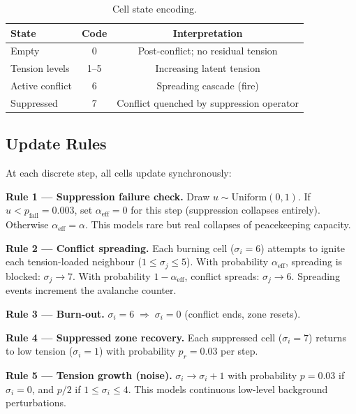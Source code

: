\documentclass[12pt,a4paper]{article}
\begin{document}
\begin{table}[h!]
\centering
\caption{Cell state encoding.}
\label{tab:states}
\begin{tabular}{lcc}
\toprule
\textbf{State}       & \textbf{Code} & \textbf{Interpretation}                        \\
\midrule
Empty                & 0             & Post-conflict; no residual tension             \\
Tension levels       & 1--5          & Increasing latent tension                      \\
Active conflict      & 6             & Spreading cascade (fire)                       \\
Suppressed           & 7             & Conflict quenched by suppression operator      \\
\bottomrule
\end{tabular}
\end{table}

\subsection{Update Rules}

At each discrete step, all cells update synchronously:

\textbf{Rule 1 --- Suppression failure check.}
Draw $u \sim \mathrm{Uniform}(0,1)$. If $u < p_{\text{fail}} = 0.003$, set
$\alpha_{\text{eff}} = 0$ for this step (suppression collapses entirely). Otherwise
$\alpha_{\text{eff}} = \alpha$. This models rare but real collapses of peacekeeping
capacity.

\textbf{Rule 2 --- Conflict spreading.}
Each burning cell ($\sigma_i = 6$) attempts to ignite each tension-loaded neighbour
($1\le\sigma_j\le 5$). With probability $\alpha_{\text{eff}}$, spreading is blocked:
$\sigma_j \to 7$. With probability $1-\alpha_{\text{eff}}$, conflict spreads:
$\sigma_j \to 6$. Spreading events increment the avalanche counter.

\textbf{Rule 3 --- Burn-out.}
$\sigma_i = 6 \;\Rightarrow\; \sigma_i = 0$ (conflict ends, zone resets).

\textbf{Rule 4 --- Suppressed zone recovery.}
Each suppressed cell ($\sigma_i = 7$) returns to low tension ($\sigma_i = 1$) with
probability $p_r = 0.03$ per step.

\textbf{Rule 5 --- Tension growth (noise).}
$\sigma_i \to \sigma_i + 1$ with probability $p = 0.03$ if $\sigma_i = 0$, and $p/2$
if $1\le\sigma_i\le 4$. This models continuous low-level background perturbations.
\end{document}
